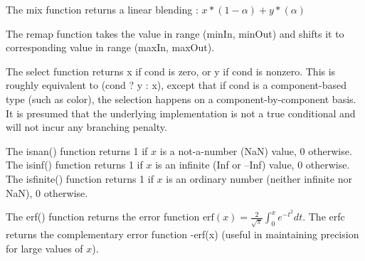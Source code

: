 \documentclass[11pt,letterpaper]{book}
\begin{document}
The {\cf mix} function returns a linear blending :
$ x*(1-\alpha) + y*(\alpha) $
\apiend

The {\cf remap} function takes the {\cf value} in range {\cf (minIn, minOut)} and shifts it to corresponding value in range {\cf (maxIn, maxOut)}.
\apiend

The {\cf select} function returns {\cf x} if {\cf cond} is zero, or {\cf y}
if {\cf cond} is nonzero. This is roughly equivalent to {\cf (cond ? y : x)},
except that if {\cf cond} is a component-based type (such as {\cf color}),
the selection happens on a component-by-component basis. It is presumed
that the underlying implementation is not a true conditional and will not
incur any branching penalty.
\apiend

  
The {\cf isnan()} function returns 1 if $x$ is a not-a-number (NaN)
value, 0 otherwise.  The {\cf isinf()} function returns 1 if $x$ is an
infinite (Inf or --Inf) value, 0 otherwise.  The {\cf isfinite()}
function returns 1 if $x$ is an ordinary number (neither infinite nor
NaN), 0 otherwise.  \apiend

 
The {\cf erf()} function returns the error function 
${\mathrm{erf}(x) = \frac{2}{\sqrt{\pi}} \int_0^x e^{-t^2}} dt$.
The {\cf erfc} returns the complementary error function {-erf(x)}
(useful in maintaining precision for large values of $x$).
\apiend
\end{document}
